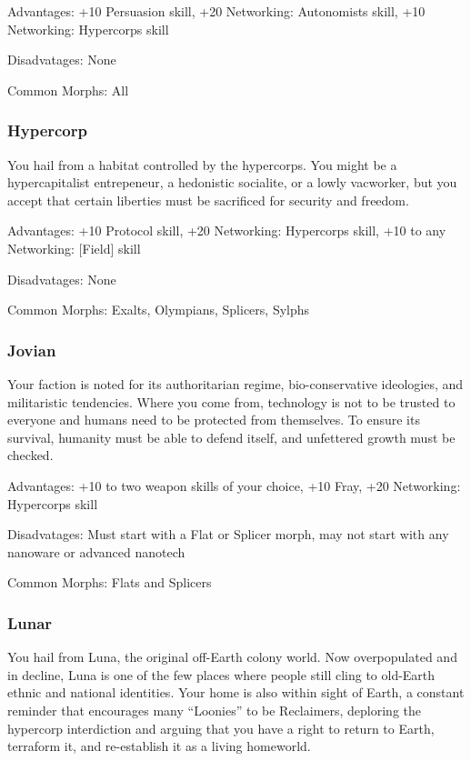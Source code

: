 Advantages: +10 Persuasion skill, +20 Networking: Autonomists skill, +10
Networking: Hypercorps skill

Disadvatages: None

Common Morphs: All

\subsubsection{Hypercorp}
You hail from a habitat controlled by the hypercorps. You might be a
hypercapitalist entrepeneur, a hedonistic socialite, or a lowly vacworker, but
you accept that certain liberties must be sacrificed for security and freedom.

Advantages: +10 Protocol skill, +20 Networking: Hypercorps skill, +10 to any
Networking: [Field] skill

Disadvatages: None

Common Morphs: Exalts, Olympians, Splicers, Sylphs

\subsubsection{Jovian}
Your faction is noted for its authoritarian regime, bio-conservative
ideologies, and militaristic tendencies.  Where you come from, technology is
not to be trusted to everyone and humans need to be protected from
themselves. To ensure its survival, humanity must be able to defend itself, and
unfettered growth must be checked.

Advantages: +10 to two weapon skills of your choice, +10 Fray, +20 Networking:
Hypercorps skill

Disadvatages: Must start with a Flat or Splicer morph, may not start with any
nanoware or advanced nanotech

Common Morphs: Flats and Splicers

\subsubsection{Lunar}
You hail from Luna, the original off-Earth colony world. Now overpopulated and
in decline, Luna is one of the few places where people still cling to old-Earth
ethnic and national identities. Your home is also within sight of Earth, a
constant reminder that encourages many “Loonies” to be Reclaimers, deploring
the hypercorp interdiction and arguing that you have a right to return to
Earth, terraform it, and re-establish it as a living homeworld.

